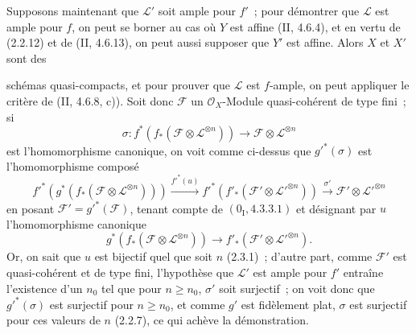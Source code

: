 \documentclass[10pt,oneside]{book}
\newcommand{\oldpage}[2][]{%
  \setcounter{footnote}{0}%
  \marginpar{\scriptsize\textbf{#1}~|~#2}\ignorespaces}
\begin{document}
Supposons maintenant que $\mathcal L'$ soit ample pour $f'$~; pour démontrer
que $\mathcal L$ est ample pour $f$, on peut se borner au cas où $Y$ est
affine (II, 4.6.4), et en vertu de (2.2.12) et de (II, 4.6.13), on peut aussi
supposer que $Y'$ est affine. Alors $X$ et $X'$ sont des

\oldpage[IV-2]{33}
schémas quasi-compacts, et pour prouver que $\mathcal L$ est $f$-ample, on
peut appliquer le critère de (II, 4.6.8, c)). Soit donc $\mathcal F$ un
$\mathcal O_X$-Module quasi-cohérent de type fini~; si
\[
\sigma:f^*(f_*(\mathcal F\otimes\mathcal L^{\otimes n}))
\longrightarrow\mathcal F\otimes\mathcal L^{\otimes n}
\]
est l'homomorphisme canonique, on voit comme ci-dessus que $g'^*(\sigma)$ est
l'homomorphisme composé
\[
f'^*(g^*(f_*(\mathcal F\otimes\mathcal L^{\otimes n})))
\xrightarrow{f'^*(u)}f'^*(f'_*(\mathcal F'\otimes
\mathcal L'^{\otimes n}))\xrightarrow{\sigma'}
\mathcal F'\otimes\mathcal L'^{\otimes n}
\]
en posant $\mathcal F'=g'^*(\mathcal F)$, tenant compte de
$(0_{\mathrm I},4.3.3.1)$ et désignant par $u$ l'homomorphisme canonique
\[
g^*(f_*(\mathcal F\otimes\mathcal L^{\otimes n}))
\longrightarrow f'_*(\mathcal F'\otimes\mathcal L'^{\otimes n}).
\]
Or, on sait que $u$ est bijectif quel que soit $n$ (2.3.1)~; d'autre part,
comme $\mathcal F'$ est quasi-cohérent et de type fini, l'hypothèse que
$\mathcal L'$ est ample pour $f'$ entraîne l'existence d'un $n_0$ tel que
pour $n\geq n_0$, $\sigma'$ soit surjectif~; on voit donc que
$g'^*(\sigma)$ est surjectif pour $n\geq n_0$, et comme $g'$ est fidèlement
plat, $\sigma$ est surjectif pour ces valeurs de $n$ (2.2.7), ce qui achève
la démonstration.
\end{document}
